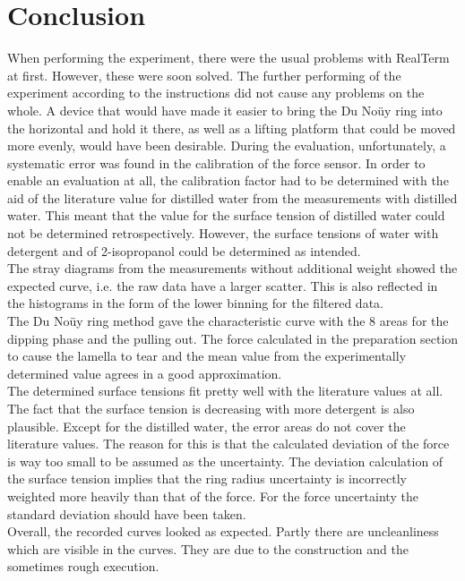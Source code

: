 \chapter{Conclusion}
When performing the experiment, there were the usual problems with RealTerm at first. However, these were soon solved. The further performing of the experiment according to the instructions did not cause any problems on the whole. A device that would have made it easier to bring the Du Noüy ring into the horizontal and hold it there, as well as a lifting platform that could be moved more evenly, would have been desirable. During the evaluation, unfortunately, a systematic error was found in the calibration of the force sensor. In order to enable an evaluation at all, the calibration factor had to be determined with the aid of the literature value for distilled water from the measurements with distilled water. This meant that the value for the surface tension of distilled water could not be determined retrospectively. However, the surface tensions of water with detergent and of 2-isopropanol could be determined as intended.\\
The stray diagrams from the measurements without additional weight showed the expected curve, i.e. the raw data have a larger scatter. This is also reflected in the histograms in the form of the lower binning for the filtered data.\\
The Du Noüy ring method gave the characteristic curve with the 8 areas for the dipping phase and the pulling out. The force calculated in the preparation section to cause the lamella to tear and the mean value from the experimentally determined value agrees in a good approximation.\\
The determined surface tensions fit pretty well with the literature values at all. The fact that the surface tension is decreasing with more detergent is also plausible. Except for the distilled water, the error areas do not cover the literature values. The reason for this is that the calculated deviation of the force is way too small to be assumed as the uncertainty. The deviation calculation of the surface tension implies that the ring radius uncertainty is incorrectly weighted more heavily than that of the force. For the force uncertainty the standard deviation should have been taken.\\
Overall, the recorded curves looked as expected. Partly there are uncleanliness which are visible in the curves. They are due to the construction and the sometimes rough execution.
